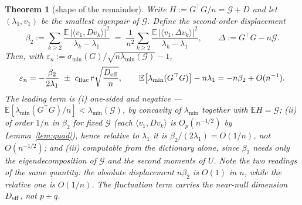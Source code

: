 \documentclass[11pt]{article}
\newtheorem{theorem}{Theorem}[section]
\theoremstyle{remark}
\newcommand{\Gr}{\mathcal{G}}
\newcommand{\minr}[1]{\sigma_{\min}(#1)}
\begin{document}
\begin{theorem}[shape of the remainder]\label{thm:bias}
Write $H:=G^{\top}G/n=\Gr+D$ and let $(\lambda_1,v_1)$ be the smallest eigenpair of
$\Gr$. Define the second-order displacement
\begin{equation}\label{eq:biasdef}
  \beta_2:=\sum_{k\ge2}\frac{\mathbb{E}\,|\langle v_1,Dv_k\rangle|^2}{\lambda_k-\lambda_1}
  \;=\;\frac1{n^2}\sum_{k\ge2}\frac{\mathbb{E}\,|\langle v_1,\Delta v_k\rangle|^2}
        {\lambda_k-\lambda_1},
  \qquad \Delta:=G^{\top}G-n\Gr .
\end{equation}
Then, with $\varepsilon_n:=\minr G/\sqrt{n\lambda_{\min}(\Gr)}-1$,
\begin{equation}\label{eq:biasform}
  \varepsilon_n=-\frac{\beta_2}{2\lambda_1}\ \pm\ c_{\rm fluc}\,r\sqrt{\frac{D_{\rm eff}}{n}},
  \qquad
  \mathbb{E}\bigl[\lambda_{\min}(G^{\top}G)\bigr]-n\lambda_1=-n\beta_2+O(n^{-1}).
\end{equation}
The leading term is (i) one-sided and negative ---
$\mathbb{E}[\lambda_{\min}(G^{\top}G)/n]<\lambda_{\min}(\Gr)$, by concavity of
$\lambda_{\min}$ together with $\mathbb{E}H=\Gr$; (ii) of order $1/n$ in $\beta_2$ for
fixed $\Gr$ (each $\langle v_1,Dv_k\rangle$ is $O_p(n^{-1/2})$ by Lemma~\ref{lem:quad}),
hence \emph{relative} to $\lambda_1$ it is $\beta_2/(2\lambda_1)=O(1/n)$, not
$O(n^{-1/2})$; and (iii) computable from the dictionary alone, since
$\beta_2$ needs only the eigendecomposition of $\Gr$ and the second moments of $U$.
Note the two readings of the same quantity: the \emph{absolute} displacement
$n\beta_2$ is $O(1)$ in $n$, while the \emph{relative} one is $O(1/n)$. The fluctuation
term carries the near-null dimension $D_{\rm eff}$, not $p+q$.
\end{theorem}
\end{document}
